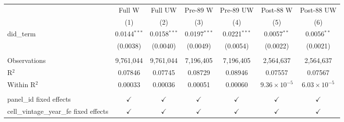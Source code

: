 
\begingroup
\centering
\begin{tabular}{lcccccc}
   \toprule
                                            & Full W         & Full UW        & Pre-89 W       & Pre-89 UW      & Post-88 W             & Post-88 UW \\   
                                            & (1)            & (2)            & (3)            & (4)            & (5)                   & (6)\\  
   \midrule 
   did\_term                                & 0.0144$^{***}$ & 0.0158$^{***}$ & 0.0197$^{***}$ & 0.0221$^{***}$ & 0.0057$^{**}$         & 0.0056$^{**}$\\   
                                            & (0.0038)       & (0.0040)       & (0.0049)       & (0.0054)       & (0.0022)              & (0.0021)\\   
    \\
   Observations                             & 9,761,044      & 9,761,044      & 7,196,405      & 7,196,405      & 2,564,637             & 2,564,637\\  
   R$^2$                                    & 0.07846        & 0.07745        & 0.08729        & 0.08946        & 0.07557               & 0.07567\\  
   Within R$^2$                             & 0.00033        & 0.00036        & 0.00051        & 0.00060        & $9.36\times 10^{-5}$  & $6.03\times 10^{-5}$\\   
    \\
   panel\_id fixed effects                  & $\checkmark$   & $\checkmark$   & $\checkmark$   & $\checkmark$   & $\checkmark$          & $\checkmark$\\   
   cell\_vintage\_year\_fe fixed effects    & $\checkmark$   & $\checkmark$   & $\checkmark$   & $\checkmark$   & $\checkmark$          & $\checkmark$\\   
   \bottomrule
\end{tabular}
\par\endgroup


